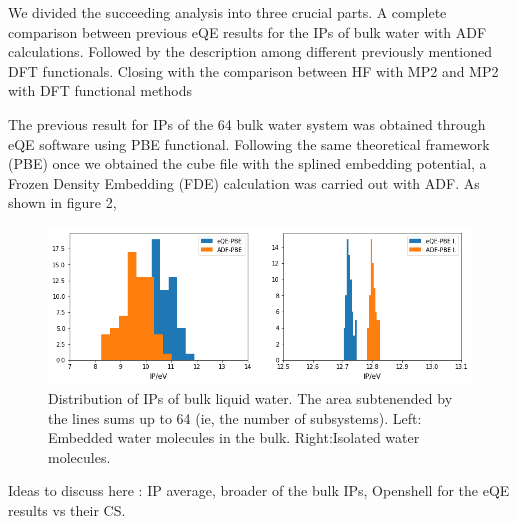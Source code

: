 \documentclass[12pt,a4paper]{article}
\begin{document}
We divided the succeeding analysis into three crucial parts. A complete comparison between previous eQE results for the
IPs of bulk water with ADF calculations. Followed by the description among different previously mentioned DFT functionals.
Closing with the comparison between HF with MP2 and MP2 with DFT functional methods

The previous result for IPs of the 64 bulk water system was obtained through eQE software using PBE functional. Following
the same theoretical framework (PBE) once we obtained the cube file with the splined embedding potential, a Frozen Density 
Embedding (FDE) calculation was carried out with ADF. As shown in figure 2,

\begin{figure}[!h]
        \centering
        \includegraphics[width=\linewidth]{eQE-ADF}
        \caption{Distribution of IPs of bulk liquid water. The area subtenended by the lines sums up to 64 (ie, the number of subsystems). Left: Embedded water molecules in the bulk. Right:Isolated water molecules. }
\end{figure}

Ideas to discuss here : IP average, broader of the bulk IPs, Openshell for the eQE results vs their CS.
\end{document}
